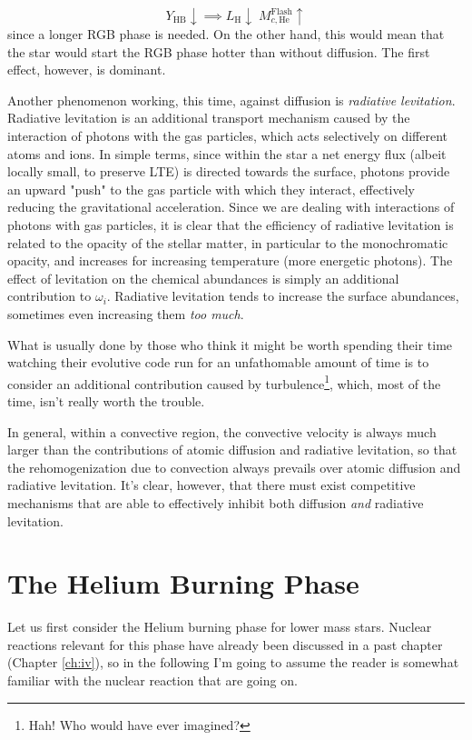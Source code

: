 \begin{equation*}
    Y_{\text{HB}}\downarrow \implies L_{\text{H}}\downarrow\;M_{c,\text{He}}^{\text{Flash}}\uparrow
\end{equation*}
since a longer RGB phase is needed. On the other hand, this would mean that the star would start the RGB phase hotter than without diffusion. The first effect, however, is dominant.
\par Another phenomenon working, this time, against diffusion is \emph{radiative levitation}. Radiative levitation is an additional transport mechanism caused by the interaction of photons with the gas particles, which acts selectively on different atoms and ions. In simple terms, since within the star a net energy flux (albeit locally small, to preserve LTE) is directed towards the surface, photons provide an upward "push" to the gas particle with which they interact, effectively reducing the gravitational acceleration. Since we are dealing with interactions of photons with gas particles, it is clear that the efficiency of radiative levitation is related to the opacity of the stellar matter, in particular to the monochromatic opacity, and increases for increasing temperature (more energetic photons). The effect of levitation on the chemical abundances is simply an additional contribution to $\omega_{i}$. Radiative levitation tends to increase the surface abundances, sometimes even increasing them \emph{too much}.
\par What is usually done by those who think it might be worth spending their time watching their evolutive code run for an unfathomable amount of time is to consider an additional contribution caused by turbulence\footnote{Hah! Who would have ever imagined?}, which, most of the time, isn't really worth the trouble.
\par In general, within a convective region, the convective velocity is always much larger than the contributions of atomic diffusion and radiative levitation, so that the rehomogenization due to convection always prevails over atomic diffusion and radiative levitation. It's clear, however, that there must exist competitive mechanisms that are able to effectively inhibit both diffusion \emph{and} radiative levitation.

\section{The Helium Burning Phase}

Let us first consider the Helium burning phase for lower mass stars. Nuclear reactions relevant for this phase have already been discussed in a past chapter (Chapter \ref{ch:iv}), so in the following I'm going to assume the reader is somewhat familiar with the nuclear reaction that are going on.

